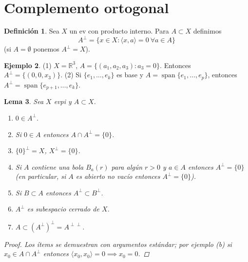 \documentclass[11pt]{article}
\theoremstyle{definition}
\newtheorem{definition}{Definición}[section]
\newtheorem{example}[definition]{Ejemplo}
\theoremstyle{plain}
\newtheorem{lemma}[definition]{Lema}
\begin{document}
\section*{Complemento ortogonal}

\begin{definition}
Sea $X$ un ev con producto interno. Para $A\subset X$ definimos
\[A^{\perp}=\{x\in X:\langle x,a\rangle=0\ \forall a\in A\}\]
(si $A=\emptyset$ ponemos $A^{\perp}=X$).
\end{definition}

\begin{example}
(1) $X=\mathbb{R}^3$, $A=\{(a_1,a_2,a_3):a_3=0\}$. Entonces $A^{\perp}=\{(0,0,x_3)\}$. 
(2) Si $\{e_1,\dots,e_k\}$ es base y $A=\operatorname{span}\{e_1,\dots,e_p\}$, entonces $A^{\perp}=\operatorname{span}\{e_{p+1},\dots,e_k\}$.
\end{example}

\begin{lemma}
Sea $X$ evpi y $A\subset X$.
\begin{enumerate}[label=\alph*)]
\item $0\in A^{\perp}$.
\item Si $0\in A$ entonces $A\cap A^{\perp}=\{0\}$.
\item $\{0\}^{\perp}=X$, $X^{\perp}=\{0\}$.
\item Si $A$ contiene una bola $B_a(r)$ para algún $r>0$ y $a\in A$ entonces $A^{\perp}=\{0\}$ (en particular, si $A$ es abierto no vacío entonces $A^{\perp}=\{0\}$).
\item Si $B\subset A$ entonces $A^{\perp}\subset B^{\perp}$.
\item $A^{\perp}$ es subespacio cerrado de $X$.
\item $A\subset(A^{\perp})^{\perp}=A^{\perp\perp}$.
\end{enumerate}
\begin{proof}
Los ítems se demuestran con argumentos estándar; por ejemplo (b) si $x_0\in A\cap A^{\perp}$ entonces $\langle x_0,x_0\rangle=0\implies x_0=0$.
\end{proof}
\end{lemma}
\end{document}
